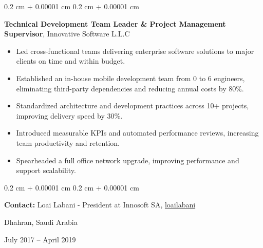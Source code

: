 \documentclass[10pt, letterpaper]{article}
\newenvironment{highlights}{
    \begin{itemize}[
        topsep=0.10 cm,
        parsep=0.10 cm,
        partopsep=0pt,
        itemsep=0pt,
        leftmargin=0.4 cm + 10pt
    ]
}{
    \end{itemize}
} %
\newenvironment{onecolentry}{
    \begin{adjustwidth}{
        0.2 cm + 0.00001 cm
    }{
        0.2 cm + 0.00001 cm
    }
}{
    \end{adjustwidth}
} %
\newenvironment{twocolentry}[2][]{
    \onecolentry
    \def\secondColumn{#2}
    \setcolumnwidth{\fill, 4.5 cm}
    \begin{paracol}{2}
}{
    \switchcolumn \raggedleft \secondColumn
    \end{paracol}
    \endonecolentry
} %
\let\hrefWithoutArrow\href
\renewcommand{\href}[2]{\hrefWithoutArrow{#1}{\ifthenelse{\equal{#2}{}}{ }{#2 }\raisebox{.15ex}{\footnotesize \faExternalLink*}}}
\begin{document}
    \begin{twocolentry}{
        Dhahran, Saudi Arabia

        July 2017 – April 2019
    }
        \textbf{Technical Development Team Leader \& Project Management Supervisor}, Innovative Software L.L.C
        \begin{highlights}
            \item Led cross-functional teams delivering enterprise software solutions to major clients on time and within budget.
            \item Established an in-house mobile development team from 0 to 6 engineers, eliminating third-party dependencies and reducing annual costs by 80\%.
            \item Standardized architecture and development practices across 10+ projects, improving delivery speed by 30\%.
            \item Introduced measurable KPIs and automated performance reviews, increasing team productivity and retention.
            \item Spearheaded a full office network upgrade, improving performance and support scalability.
        \end{highlights}

        \begin{onecolentry}
            \textbf{Contact:} Loai Labani - President at Innosoft SA,
            \mbox{\hrefWithoutArrow{https://www.linkedin.com/in/loailabani/}{{\footnotesize\faLinkedinIn}\hspace*{0.13cm}loailabani}}%
        \end{onecolentry}
    \end{twocolentry}

    \vspace{0.2 cm}
\end{document}
